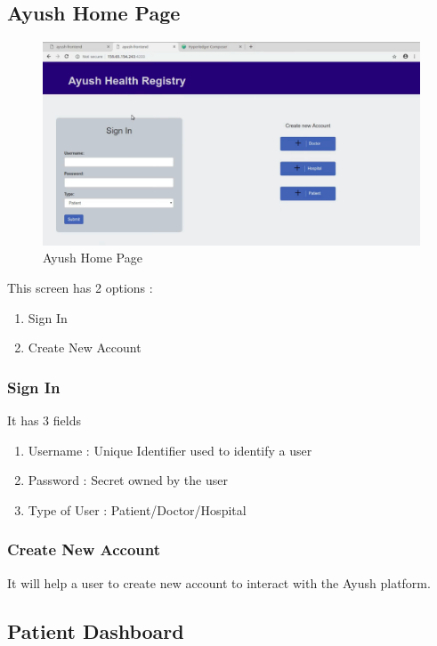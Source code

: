 \documentclass[11pt]{report}
\begin{document}
   \subsection{Ayush Home Page}
            \begin{figure}[h!]
        \centering
        \includegraphics[scale=0.3]{proto1.png}
        \caption{Ayush Home Page}
        \label{fig:my_label}
    \end{figure}
    This screen has 2 options :
    \begin{enumerate}
        \item Sign In
        \item Create New Account
    \end{enumerate}
    \subsubsection{Sign In}
    It has 3 fields
    \begin{enumerate}
        \item Username : Unique Identifier used to identify a user
        \item Password : Secret owned by the user
        \item Type of User : Patient/Doctor/Hospital
    \end{enumerate}
    
    \subsubsection{Create New Account}
    It will help a user to create new account to interact with the Ayush platform.
    
   \newpage 
  \subsection{Patient Dashboard}  
 
\end{document}

